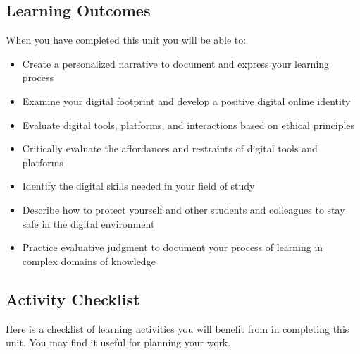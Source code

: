 \documentclass[
  letterpaper,
  DIV=11,
  numbers=noendperiod]{scrreprt}
\providecommand{\tightlist}{%
  \setlength{\itemsep}{0pt}\setlength{\parskip}{0pt}}\usepackage{longtable,booktabs,array}
\begin{document}
\subsection*{Learning Outcomes}\label{learning-outcomes-2}

When you have completed this unit you will be able to:

\begin{itemize}
\tightlist
\item
  Create a personalized narrative to document and express your learning
  process
\item
  Examine your digital footprint and develop a positive digital online
  identity
\item
  Evaluate digital tools, platforms, and interactions based on ethical
  principles
\item
  Critically evaluate the affordances and restraints of digital tools
  and platforms
\item
  Identify the digital skills needed in your field of study
\item
  Describe how to protect yourself and other students and colleagues to
  stay safe in the digital environment
\item
  Practice evaluative judgment to document your process of learning in
  complex domains of knowledge
\end{itemize}

\subsection*{Activity Checklist}\label{activity-checklist-3}

Here is a checklist of learning activities you will benefit from in
completing this unit. You may find it useful for planning your work.
\end{document}
